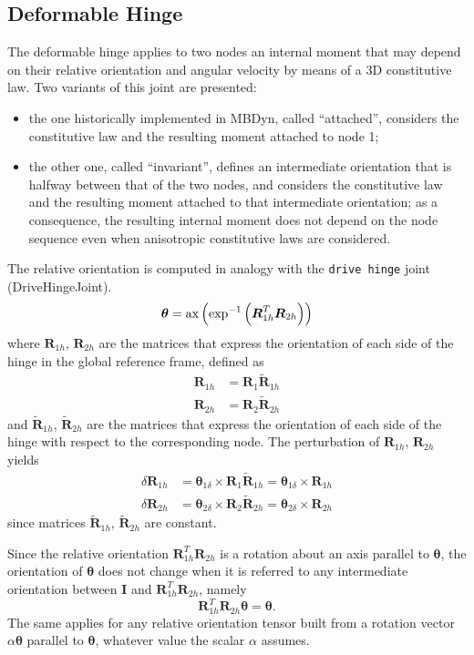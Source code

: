 \documentclass[10pt,dvips,fleqn,subeqn]{report}
\newcommand{\T}[1]{\boldsymbol{#1}}
\begin{document}
\subsection{Deformable Hinge}
The deformable hinge applies to two nodes an internal moment that may depend
on their relative orientation and angular velocity by means 
of a 3D constitutive law.
Two variants of this joint are presented:
\begin{itemize}
\item the one historically implemented in MBDyn, called ``attached'',
considers the constitutive law and the resulting moment attached to node 1;
\item the other one, called ``invariant'', defines an intermediate
orientation that is halfway between that of the two nodes, and considers
the constitutive law and the resulting moment attached to that intermediate
orientation; as a consequence, the resulting internal moment does not depend
on the node sequence even when anisotropic constitutive laws are considered.
\end{itemize}
The relative orientation is computed in analogy with the \texttt{drive hinge}
joint (DriveHingeJoint).
\begin{equation}
	\T{\theta} =
	\llk{ax}\plbr{\llk{exp}^{-1}\plbr{\T{R}_{1h}^T \T{R}_{2h}}}
\end{equation}
where $\T{R}_{1h}$, $\T{R}_{2h}$ are the matrices that express
the orientation of each side of the hinge in the global reference frame,
defined as
\begin{align}
	\T{R}_{1h} &= \T{R}_{1} \tilde{\T{R}}_{1h} \\
	\T{R}_{2h} &= \T{R}_{2} \tilde{\T{R}}_{2h}
\end{align}
and $\tilde{\T{R}}_{1h}$, $\tilde{\T{R}}_{2h}$ are the matrices
that express the orientation of each side of the hinge with respect
to the corresponding node.
The perturbation of $\T{R}_{1h}$, $\T{R}_{2h}$ yields
\begin{align}
	\delta \T{R}_{1h} &= \T{\theta}_{1\delta} \times \T{R}_{1} \tilde{\T{R}}_{1h}
		= \T{\theta}_{1\delta} \times \T{R}_{1h} \\
	\delta \T{R}_{2h} &= \T{\theta}_{2\delta} \times \T{R}_{2} \tilde{\T{R}}_{2h}
		= \T{\theta}_{2\delta} \times \T{R}_{2h}
\end{align}
since matrices $\tilde{\T{R}}_{1h}$, $\tilde{\T{R}}_{2h}$ are constant.

Since the relative orientation $\T{R}_{1h}^T \T{R}_{2h}$ is a rotation 
about an axis parallel to $\T{\theta}$, the orientation of $\T{\theta}$
does not change when it is referred to any intermediate orientation
between $\T{I}$ and $\T{R}_{1h}^T \T{R}_{2h}$, namely
\begin{equation}
	\T{R}_{1h}^T \T{R}_{2h}\T{\theta} = \T{\theta} .
\end{equation}
The same applies for any relative orientation tensor built from a rotation
vector $\alpha\T{\theta}$ parallel to $\T{\theta}$, whatever value 
the scalar $\alpha$ assumes.
\end{document}
